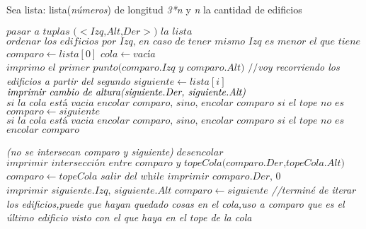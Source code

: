 \documentclass{article}
\begin{document}
Sea lista: lista(\textit{números}) de longitud \textit{3*n} y \textit{n} la cantidad de edificios
\vspace{0.4cm}
\begin{algorithmic}[1]
        \State $\textit{pasar a tuplas ($<$Izq,Alt,Der$>$) la lista}$
        \State $\textit{ordenar los edificios por Izq, en caso de tener mismo Izq es menor el que tiene mayor Alt}$
        \State $comparo\gets lista[0]$
        \State $cola\gets \textit{vacía}$
        \State $\textit{imprimo el primer punto(comparo.Izq y comparo.Alt)}$
         \textit{$//$voy recorriendo los edificios a partir del segundo}
                \State $siguiente\gets lista[i]$
                                \State $\textit{imprimir cambio de altura(\textit{siguiente.Der, siguiente.Alt})}$
                                \State$\textit{si la cola está vacia encolar comparo, sino, encolar comparo si el tope no es comparo}$                          
                                        \State $comparo\gets siguiente$
                        \EndIf
                                \State$\textit{si la cola está vacia encolar comparo, sino, encolar comparo si el tope no es comparo}$                          
                        \EndIf
                                \State $\textit{encolar comparo}$
                        \EndIf
                        
                \Else \textit{(no se intersecan comparo y siguiente)}
                                        \State $\textit{desencolar}$
                                        \Else 
                                        \State $\textit{imprimir intersección entre comparo y topeCola(comparo.Der,topeCola.Alt)}$
                                        \State $comparo\gets topeCola$
                                        \State $\textit{salir del while}$
                                        \EndIf
                                \EndWhile
                        \State $\textit{imprimir comparo.Der, 0 }$
                        \State $\textit{imprimir siguiente.Izq, siguiente.Alt}$
                        \State $comparo\gets siguiente$
                        \EndIf
                \EndIf
        \EndFor\textit{//terminé de iterar los edificios,puede que hayan quedado cosas en el cola,uso a comparo que es el último edificio visto con el que haya en el tope de la cola} \newpage
        

\end{algorithmic}
\end{document}
